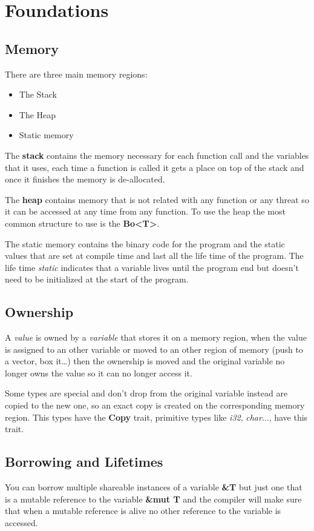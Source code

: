 \section{Foundations}

\subsection{Memory}

There are three main memory regions:

\begin{itemize}
    \item The Stack
    \item The Heap
    \item Static memory
\end{itemize}

The \textbf{stack} contains the memory necessary for each function call and the variables that it uses,
each time a function is called it gets a place on top of the stack and once it finishes the memory is de-allocated.

The \textbf{heap} contains memory that is not related with any function or any threat so it can be accessed at any time from any function.
To use the heap the most common structure to use is the \textbf{Bo<T>}.

The static memory contains the binary code for the program and the static values that are set at compile time and last all the life time of the program.
The life time \textit{static} indicates that a variable lives until the program end but doesn’t need to be initialized at the start of the program.

\subsection{Ownership}

A \textit{value} is owned by a \textit{variable} that stores it on a memory region,
when the value is assigned to an other variable or moved to an other region of memory (push to a vector, box it…)
then the ownership is moved and the original variable no longer owns the value so it can no longer access it.

Some types are special and don’t drop from the original variable instead are copied to the new one,
so an exact copy is created on the corresponding memory region.
This types have the \textbf{Copy} trait, primitive types like \textit{i32}, \textit{char}$\dots$, have this trait.

\subsection{Borrowing and Lifetimes}

You can borrow multiple shareable instances of a variable \textbf{\&T} but just one that is a mutable reference to the variable \textbf{\&mut T}
and the compiler will make sure that when a mutable reference is alive no other reference to the variable is accessed.
